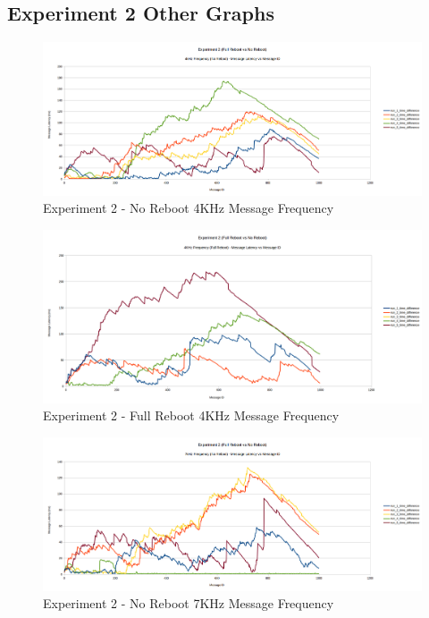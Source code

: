 \documentclass{l4proj}
\begin{document}
\begin{appendices}

\chapter{Experiment 2 Other Graphs}

\begin{figure}
\centering
\includegraphics[width=\textwidth]{images/no-reboot-4khz.png}
\caption{Experiment 2 - No Reboot 4KHz Message Frequency}
\label{exp2-noreboot-4khz}
\end{figure}

\begin{figure}
\centering
\includegraphics[width=\textwidth]{images/full-reboot-4khz.png}
\caption{Experiment 2 - Full Reboot 4KHz Message Frequency}
\label{exp2-fullreboot-4khz}
\end{figure}

\begin{figure}
\centering
\includegraphics[width=\textwidth]{images/no-reboot-7khz.png}
\caption{Experiment 2 - No Reboot 7KHz Message Frequency}
\label{exp2-noreboot-7khz}
\end{figure}


\end{appendices}
\end{document}
